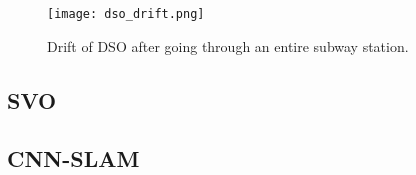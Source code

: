 \begin{figure}[H]
  \centering
  \texttt{[image: dso\_drift.png]}
    \caption{Drift of DSO after going through an entire subway station. \cite{dsovid}}
    \label{fig:dsodrift}
\end{figure}

\subsection{SVO}

\subsection{CNN-SLAM}
